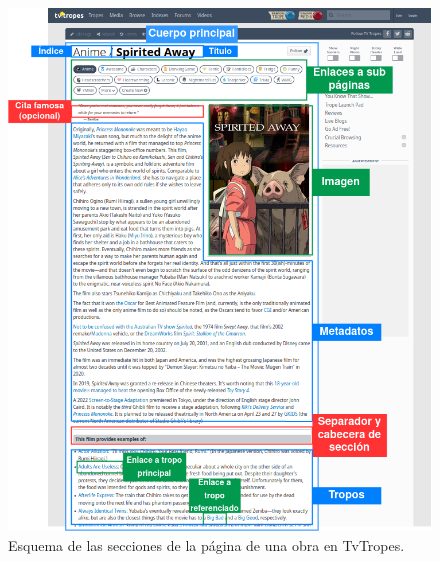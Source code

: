 \begin{figure}[!h]
  \centering
  \includegraphics[width=\textwidth]{img/esquema-obra.png}
  \caption{Esquema de las secciones de la página de una obra en TvTropes.}
  \label{fig:tvtropes-work}
\end{figure}

